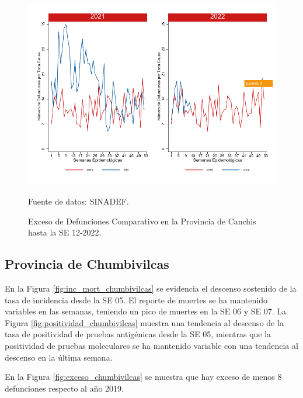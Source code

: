 \documentclass[12pt,a4paper,openany]{book}
\begin{document}
		\begin{figure}[h]
			\caption{Exceso de Defunciones Comparativo en la Provincia de Canchis hasta la SE 12-2022.}\label{fig:exceso_canchis}
			\begin{center}
				\includegraphics[width=0.7\linewidth]{../figuras/exceso_5.pdf}
			\end{center}
			{\footnotesize {Fuente de datos: SINADEF.}}
		\end{figure}
		
		\clearpage
		
		\subsection*{Provincia de Chumbivilcas}
		\noindent En la Figura \ref{fig:inc_mort_chumbivilcas} se evidencia el descenso sostenido de la tasa de incidencia desde la SE 05. El reporte de muertes se ha mantenido variables en las semanas, teniendo un pico de muertes en la SE 06 y SE 07. 
		\noindent La Figura \ref{fig:positividad_chumbivilcas} muestra una tendencia al descenso de la tasa de positividad de pruebas antigénicas desde la SE 05, mientras que la positividad de pruebas moleculares se ha mantenido variable con una tendencia al descenso en la última semana. 
		
		En la Figura \ref{fig:exceso_chumbivilcas} se muestra que hay exceso de menos 8 defunciones respecto al año 2019.
		
\end{document}
